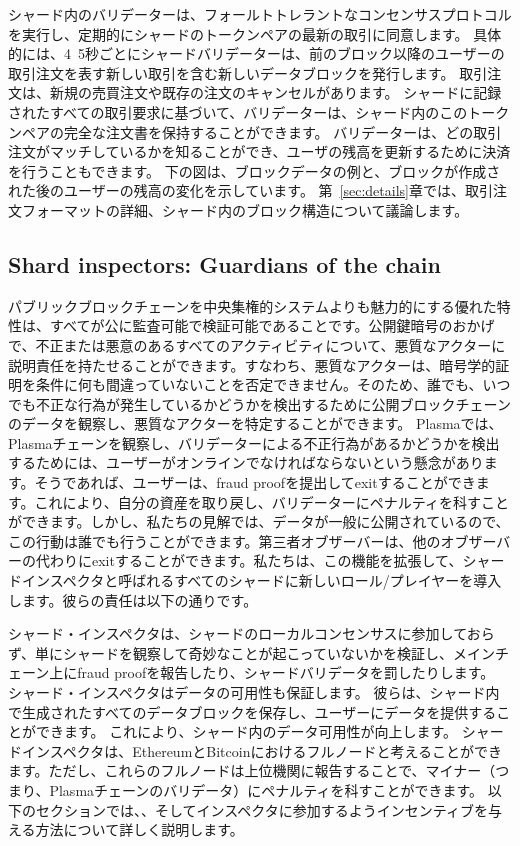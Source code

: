 シャード内のバリデーターは、フォールトトレラントなコンセンサスプロトコルを実行し、定期的にシャードのトークンペアの最新の取引に同意します。 具体的には、4~5秒ごとにシャードバリデーターは、前のブロック以降のユーザーの取引注文を表す新しい取引を含む新しいデータブロックを発行します。 取引注文は、新規の売買注文や既存の注文のキャンセルがあります。 シャードに記録されたすべての取引要求に基づいて、バリデーターは、シャード内のこのトークンペアの完全な注文書を保持することができます。 バリデーターは、どの取引注文がマッチしているかを知ることができ、ユーザの残高を更新するために決済を行うこともできます。 下の図は、ブロックデータの例と、ブロックが作成された後のユーザーの残高の変化を示しています。 第~\ref{sec:details}章では、取引注文フォーマットの詳細、シャード内のブロック構造について議論します。

\subsection{Shard inspectors: Guardians of the chain}

パブリックブロックチェーンを中央集権的システムよりも魅力的にする優れた特性は、すべてが公に監査可能で検証可能であることです。公開鍵暗号のおかげで、不正または悪意のあるすべてのアクティビティについて、悪質なアクターに説明責任を持たせることができます。すなわち、悪質なアクターは、暗号学的証明を条件に何も間違っていないことを否定できません。そのため、誰でも、いつでも不正な行為が発生しているかどうかを検出するために公開ブロックチェーンのデータを観察し、悪質なアクターを特定することができます。 Plasmaでは、Plasmaチェーンを観察し、バリデーターによる不正行為があるかどうかを検出するためには、ユーザーがオンラインでなければならないという懸念があります。そうであれば、ユーザーは、fraud proofを提出してexitすることができます。これにより、自分の資産を取り戻し、バリデーターにペナルティを科すことができます。しかし、私たちの見解では、データが一般に公開されているので、この行動は誰でも行うことができます。第三者オブザーバーは、他のオブザーバーの代わりにexitすることができます。私たちは、この機能を拡張して、シャー​​ドインスペクタと呼ばれるすべてのシャードに新しいロール/プレイヤーを導入します。彼らの責任は以下の通りです。

シャード・インスペクタは、シャードのローカルコンセンサスに参加しておらず、単にシャードを観察して奇妙なことが起こっていないかを検証し、メインチェーン上にfraud proofを報告したり、シャードバリデータを罰したりします。 シャード・インスペクタはデータの可用性も保証します。 彼らは、シャード内で生成されたすべてのデータブロックを保存し、ユーザーにデータを提供することができます。 これにより、シャード内のデータ可用性が向上します。 シャードインスペクタは、EthereumとBitcoinにおけるフルノードと考えることができます。ただし、これらのフルノードは上位機関に報告することで、マイナー（つまり、Plasmaチェーンのバリデータ）にペナルティを科すことができます。 以下のセクションでは、、そしてインスペクタに参加するようインセンティブを与える方法について詳しく説明します。

